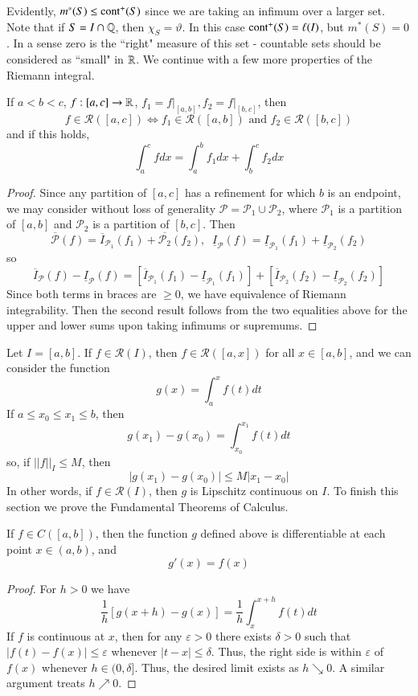 Evidently, $m^*(S) \leq \text{cont}^+(S)$ since we are taking an infimum over a larger set. Note that if $S = I\cap \mathbb Q$, then $\chi_S = \vartheta$. In this case $\text{cont}^+(S) = \ell(I)$, but $m^*(S) = 0$. In a sense zero is the ``right" measure of this set - countable sets should be considered as ``small" in $\mathbb R$. We continue with a few more properties of the Riemann integral.

\begin{proposition}
    If $a < b < c$, $f: [a,c]\rightarrow \mathbb R$, $f_1 = f\vert_{[a,b]}, f_2 = f\vert_{[b,c]}$, then $$f \in \mathcal{R}([a,c]) \iff f_1 \in \mathcal{R}([a,b])\text{ and }f_2 \in \mathcal{R}([b,c])$$
    and if this holds, $$\int_a^cfdx = \int_a^bf_1dx + \int_b^cf_2dx$$
\end{proposition}
\begin{proof}
    Since any partition of $[a,c]$ has a refinement for which $b$ is an endpoint, we may consider without loss of generality $\mathcal{P} = \mathcal{P}_1\cup\mathcal{P}_2$, where $\mathcal{P}_1$ is a partition of $[a,b]$ and $\mathcal{P}_2$ is a partition of $[b,c]$. Then $$\overline{\mathcal{P}}(f) = \overline{I}_{\mathcal{P}_1}(f_1) + \overline{\mathcal{P}_2}(f_2),\;\;\underline{I}_{\mathcal{P}}(f) = \underline{I}_{\mathcal{P}_1}(f_1)+\underline{I}_{\mathcal{P}_2}(f_2)$$
    so $$\overline{I}_{\mathcal{P}}(f) - \underline{I}_{\mathcal{P}}(f) = [\overline{I}_{\mathcal{P}_1}(f_1) - \underline{I}_{\mathcal{P}_1}(f_1)] +  [\overline{I}_{\mathcal{P}_2}(f_2) - \underline{I}_{\mathcal{P}_2}(f_2)]$$ 
    Since both terms in braces are $\geq 0$, we have equivalence of Riemann integrability. Then the second result follows from the two equalities above for the upper and lower sums upon taking infimums or supremums.
\end{proof}

Let $I = [a,b]$. If $f \in \mathcal{R}(I)$, then $f \in \mathcal{R}([a,x])$ for all $x \in [a,b]$, and we can consider the function $$g(x) = \int_a^xf(t)dt$$ 
If $a \leq x_0 \leq x_1 \leq b$, then $$g(x_1) - g(x_0) = \int_{x_0}^{x_1}f(t)dt$$
so, if $||f||_I \leq M$, then $$|g(x_1)-g(x_0)| \leq M|x_1-x_0|$$
In other words, if $f \in \mathcal{R}(I)$, then $g$ is Lipschitz continuous on $I$. To finish this section we prove the Fundamental Theorems of Calculus.

\begin{theorem}
    If $f \in C([a,b])$, then the function $g$ defined above is differentiable at each point $x \in (a,b)$, and $$g'(x) = f(x)$$
\end{theorem}
\begin{proof}
    For $h > 0$ we have $$\frac{1}{h}[g(x+h) - g(x)] = \frac{1}{h}\int_x^{x+h}f(t)dt$$
    If $f$ is continuous at $x$, then for any $\varepsilon > 0$ there exists $\delta > 0$ such that $|f(t) - f(x)| \leq \varepsilon$ whenever $|t-x| \leq \delta$. Thus, the right side is within $\varepsilon$ of $f(x)$ whenever $h \in (0,\delta]$. Thus, the desired limit exists as $h\searrow 0$. A similar argument treats $h\nearrow 0$.
\end{proof}

